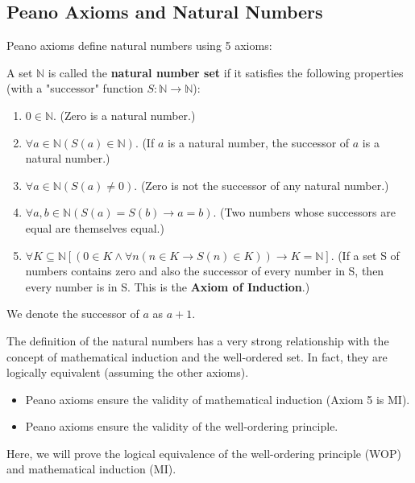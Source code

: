 \documentclass[oneside]{book}
\begin{document}
\subsection{Peano Axioms and Natural Numbers}
Peano axioms define natural numbers using 5 axioms:
\begin{definition}
A set $\mathbb{N}$ is called the \textbf{natural number set} if it satisfies the following properties (with a "successor" function $S: \mathbb{N} \to \mathbb{N}$):
\begin{enumerate}
    \item $0 \in \mathbb{N}$. (Zero is a natural number.)
    \item $\forall a \in \mathbb{N} (S(a) \in \mathbb{N})$. (If $a$ is a natural number, the successor of $a$ is a natural number.)
    \item $\forall a \in \mathbb{N} (S(a) \ne 0)$. (Zero is not the successor of any natural number.)
    \item $\forall a, b \in \mathbb{N} (S(a) = S(b) \to a = b)$. (Two numbers whose successors are equal are themselves equal.)
    \item $\forall K \subseteq \mathbb{N} [(0 \in K \wedge \forall n (n \in K \to S(n) \in K)) \to K = \mathbb{N}]$. (If a set S of numbers contains zero and also the successor of every number in S, then every number is in S. This is the \textbf{Axiom of Induction}.)
\end{enumerate}
We denote the successor of $a$ as $a+1$.
\end{definition}

The definition of the natural numbers has a very strong relationship with the concept of mathematical induction and the well-ordered set. In fact, they are logically equivalent (assuming the other axioms).
\begin{itemize}
    \item Peano axioms ensure the validity of mathematical induction (Axiom 5 is MI).
    \item Peano axioms ensure the validity of the well-ordering principle.
\end{itemize}

Here, we will prove the logical equivalence of the well-ordering principle (WOP) and mathematical induction (MI).
\end{document}
